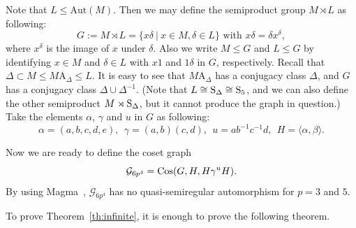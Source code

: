 \documentclass[12pt,reqno]{amsart}
\newcommand\A{\mathrm{A}} \newcommand\AGL{\mathrm{AGL}} \newcommand\AGammaL{\mathrm{A\Gamma L}} \newcommand\Alt{\mathrm{Alt}} \newcommand\ASL{\mathrm{ASL}} \newcommand\ASigmaL{\mathrm{A \Sigma L}} \newcommand\Aut{\mathrm{Aut}}
\newcommand{\cG}{\mathcal{G}}
\numberwithin {equation} {section}
\begin{document}
Note that $L\leq \Aut(M)$. Then we may define the semiproduct group $M\rtimes L$ as following:
\[G:=M\rtimes L=\{x\delta\ |\ x\in M, \delta\in L\} \mbox{ with } x\delta=\delta x^\delta,\]
where $x^\delta$ is the image of $x$ under $\delta$. Also we write $M\leq G$ and $L\leq G$ by identifying $x\in M$ and $\delta\in L$ with $x1$ and $1\delta$ in $G$, respectively. Recall that $\Delta\subset M\leq M\A_{\Delta}\leq L$.
It is easy to see that $M\A_\Delta$ has a conjugacy class $\Delta$, and $G$ has a conjugacy class $\Delta\cup \Delta^{-1}$. (Note that $L\cong\mathrm{S}_\Delta\cong\mathrm{S}_5$, and we can also define the other semiproduct $M\rtimes \mathrm{S}_\Delta$, but it cannot produce the graph in question.) Take the elements $\alpha$,  $\gamma$ and $u$ in $G$ as following:
\[\alpha=(a,b,c,d,e),\ \  \gamma=(a,b)(c,d), \ \ u=ab^{-1}c^{-1}d,\ \ H=\langle \alpha,\beta\rangle.\]

Now we are ready to define the coset graph
\[\cG_{6p^4} =\Cos(G, H, H{\gamma^u}H).\]
By using {\sc Magma}~\cite{Magma}, $\cG_{6p^4}$ has no quasi-semiregular automorphism for $p=3$ and $5$.

To prove Theorem~\ref{th:infinite}, it is enough to prove the following theorem.
\end{document}

